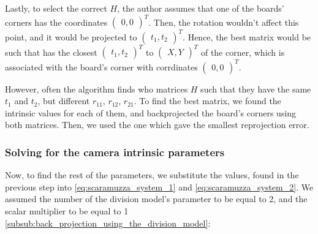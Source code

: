 Lastly, to select the correct \(H\), the author assumes that one of the boards'
corners has the coordinates \( \begin{pmatrix}
	0, 0
\end{pmatrix}^{T}\). Then, the rotation wouldn't affect this
point, and it would be projected to   \(\begin{pmatrix}
	t_1, t_2
\end{pmatrix}^{T}\). Hence, the best matrix would be such that has the closest
\(\begin{pmatrix}
	t_1, t_2
\end{pmatrix}^{T}\) to \(\begin{pmatrix}
	X, Y
\end{pmatrix}^{T}\) of the corner, which is associated with the board's corner
with corrdinates \(\begin{pmatrix}
	0, 0
\end{pmatrix}^{T}\).

However, often the algorithm finds who matrices \(H\) such that they have the
same \(t_1\) and \(t_2 \), but different \(r_{11}\), \(r_{12}\), \(r_{21}\). To
find the best matrix, we found the intrinsic values for each of them, and
backprojected the board's corners using both matrices.
Then, we used the one which gave the smallest reprojection error.

\subsubsection{Solving for the camera intrinsic parameters}\label{subsub:solving_for_the_camera_intrinsic_parameters}

Now, to find the rest of the parameters, we substitute the values, found in the
previous step into \cref{eq:scaramuzza_system_1} and
\cref{eq:scaramuzza_system_2}. We assumed the number of the division model's
parameter to be equal to 2, and the scalar multiplier to be equal to 1
\cref{subsub:back_projection_using_the_division_model}:

